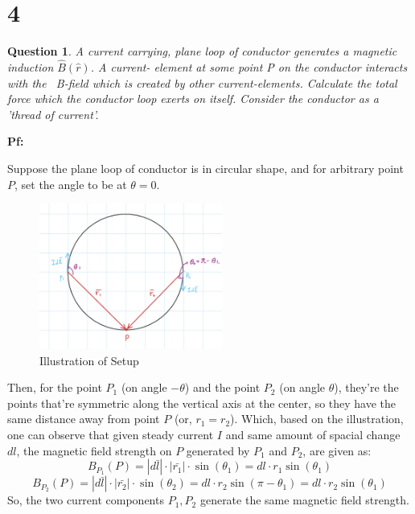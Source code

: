 \documentclass{article}
\newtheorem{question}{Question}
\begin{document}
\break

\section*{4}
\begin{myBox}[]{}
    \begin{question}
        A current carrying, plane loop of conductor generates a magnetic induction $\hat{B}(\hat{r})$. A current-
        element at some point P on the conductor interacts with the ~B-field which is created by other
        current-elements. Calculate the total force which the conductor loop exerts on itself. Consider
        the conductor as a ’thread of current’.
    \end{question}
\end{myBox}

\textbf{Pf:}

Suppose the plane loop of conductor is in circular shape, and for arbitrary point $P$, set the angle to be at $\theta=0$.
\begin{figure}[h!]
    \begin{center}
        \includegraphics[width=60mm]{IMG_0190.jpg}
        \caption{Illustration of Setup}
    \end{center}
\end{figure}
Then, for the point $P_1$ (on angle $-\theta$) and the point $P_2$ (on angle $\theta$), they're the points that're symmetric along the vertical axis at the center,
so they have the same distance away from point $P$ (or, $r_1=r_2$).
Which, based on the illustration, one can observe that given steady current $I$ and same amount of spacial change $dl$, the magnetic field strength on $P$ generated by $P_1$ and $P_2$,
are given as:
$$B_{P_1}(P) = |d\bar{l}|\cdot|\bar{r_1}|\cdot\sin(\theta_1) = dl\cdot r_1\sin(\theta_1)$$
$$B_{P_2}(P)=|d\bar{l}|\cdot|\bar{r_2}|\cdot\sin(\theta_2)=dl\cdot r_2\sin(\pi-\theta_1)=dl\cdot r_2\sin(\theta_1)$$
So, the two current components $P_1,P_2$ generate the same magnetic field strength.
\end{document}
